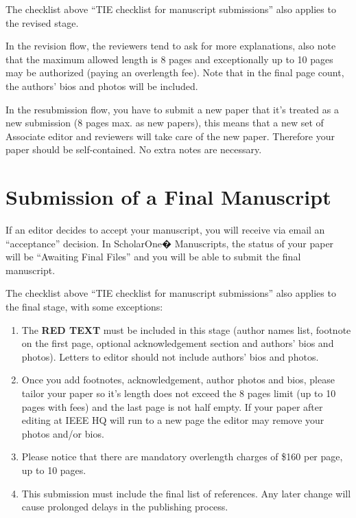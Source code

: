 \documentclass[journal]{IEEEtranTIE}
\begin{document}
The checklist above ``TIE checklist for manuscript submissions'' also applies to the revised stage.

In the revision flow, the reviewers tend to ask for more explanations, also note that the maximum allowed length is 8 pages and exceptionally up to 10 pages may be authorized (paying an overlength fee). Note that in the final page count, the authors' bios and photos will be included.

In the resubmission flow, you have to submit a new paper that it's treated as a new submission (8 pages max. as new papers), this means that a new set of Associate editor and reviewers will take care of the new paper. Therefore your paper should be self-contained. No extra notes are necessary.


\section{Submission of a Final Manuscript}

If an editor decides to accept your manuscript, you will receive via email an ``acceptance'' decision. In ScholarOne� Manuscripts, the status of your paper will be ``Awaiting Final Files'' and you will be able to submit the final manuscript.

The checklist above ``TIE checklist for manuscript submissions'' also applies to the final stage, with some exceptions:

\begin{enumerate}[1)]
	\item The {\color{red} \textbf{RED TEXT}} must be included in this stage (author names list, footnote on the first page, optional acknowledgement section and authors' bios and photos). Letters to editor should not include authors' bios and photos.
	\item Once you add footnotes, acknowledgement, author photos and bios, please tailor your paper so it's length does not exceed the 8 pages limit (up to 10 pages with fees) and the last page is not half empty. If your paper after editing at IEEE HQ will run to a new page the editor may remove your photos and/or bios.
	\item Please notice that there are mandatory overlength charges of \$160 per page, up to 10 pages.
	\item This submission must include the final list of references. Any later change will cause prolonged delays in the publishing process.
\end{enumerate}
	
\end{document}
